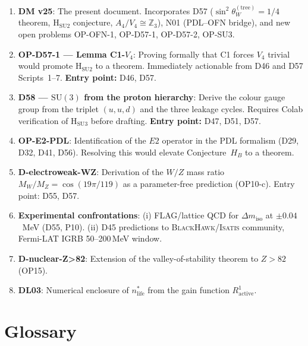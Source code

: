 \documentclass[11pt,a4paper]{article}
\theoremstyle{plain}
\theoremstyle{definition}
\theoremstyle{remark}
\begin{document}
\begin{enumerate}
\item \textbf{DM v25}: The present document. Incorporates D57 ($\sin^2\theta_W^{(\mathrm{tree})}=1/4$ theorem, H$_{\mathrm{SU2}}$ conjecture, $A_4/V_4\cong\mathbb{Z}_3$), N01 (PDL--OFN bridge), and new open problems OP-OFN-1, OP-D57-1, OP-D57-2, OP-SU3.
\item \textbf{OP-D57-1 --- Lemma C1-$V_4$}: Proving formally that C1 forces $V_4$ trivial would promote H$_{\mathrm{SU2}}$ to a theorem. Immediately actionable from D46 and D57 Scripts~1--7. \textbf{Entry point:} D46, D57.
\item \textbf{D58 --- $\mathrm{SU}(3)$ from the proton hierarchy}: Derive the colour gauge group from the triplet $(u,u,d)$ and the three leakage cycles. Requires Colab verification of H$_{\mathrm{SU3}}$ before drafting. \textbf{Entry point:} D47, D51, D57.
\item \textbf{OP-E2-PDL}: Identification of the $E2$ operator in the PDL formalism (D29, D32, D41, D56). Resolving this would elevate Conjecture~$H_B$ to a theorem.
\item \textbf{D-electroweak-WZ}: Derivation of the $W/Z$ mass ratio $M_W/M_Z = \cos(19\pi/119)$ as a parameter-free prediction (OP10-c). Entry point: D55, D57.
\item \textbf{Experimental confrontations}: (i) FLAG/lattice QCD for $\Delta m_{\mathrm{iso}}$ at $\pm 0.04$~MeV (D55, P10). (ii) D45 predictions to \textsc{BlackHawk}/\textsc{Isatis} community, Fermi-LAT IGRB 50--200\,MeV window.
\item \textbf{D-nuclear-Z>82}: Extension of the valley-of-stability theorem to $Z>82$ (OP15).
\item \textbf{DL03}: Numerical enclosure of $n^*_{\mathrm{life}}$ from the gain function $R^1_{\mathrm{active}}$.
\end{enumerate}


\section{Glossary}
\label{sec:glossary}
\end{document}
